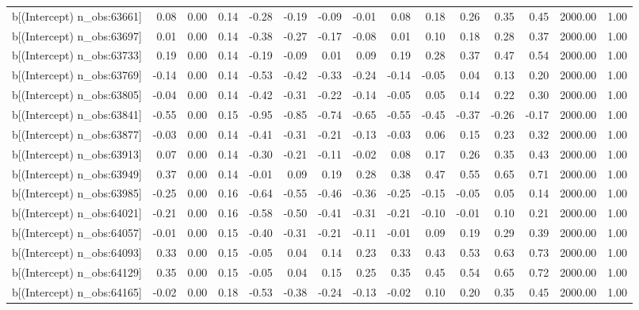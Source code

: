\begin{table}[ht]
\begin{tabular}{rrrrrrrrrrrrrrr}
  b[(Intercept) n\_obs:63661] & 0.08 & 0.00 & 0.14 & -0.28 & -0.19 & -0.09 & -0.01 & 0.08 & 0.18 & 0.26 & 0.35 & 0.45 & 2000.00 & 1.00 \\ 
  b[(Intercept) n\_obs:63697] & 0.01 & 0.00 & 0.14 & -0.38 & -0.27 & -0.17 & -0.08 & 0.01 & 0.10 & 0.18 & 0.28 & 0.37 & 2000.00 & 1.00 \\ 
  b[(Intercept) n\_obs:63733] & 0.19 & 0.00 & 0.14 & -0.19 & -0.09 & 0.01 & 0.09 & 0.19 & 0.28 & 0.37 & 0.47 & 0.54 & 2000.00 & 1.00 \\ 
  b[(Intercept) n\_obs:63769] & -0.14 & 0.00 & 0.14 & -0.53 & -0.42 & -0.33 & -0.24 & -0.14 & -0.05 & 0.04 & 0.13 & 0.20 & 2000.00 & 1.00 \\ 
  b[(Intercept) n\_obs:63805] & -0.04 & 0.00 & 0.14 & -0.42 & -0.31 & -0.22 & -0.14 & -0.05 & 0.05 & 0.14 & 0.22 & 0.30 & 2000.00 & 1.00 \\ 
  b[(Intercept) n\_obs:63841] & -0.55 & 0.00 & 0.15 & -0.95 & -0.85 & -0.74 & -0.65 & -0.55 & -0.45 & -0.37 & -0.26 & -0.17 & 2000.00 & 1.00 \\ 
  b[(Intercept) n\_obs:63877] & -0.03 & 0.00 & 0.14 & -0.41 & -0.31 & -0.21 & -0.13 & -0.03 & 0.06 & 0.15 & 0.23 & 0.32 & 2000.00 & 1.00 \\ 
  b[(Intercept) n\_obs:63913] & 0.07 & 0.00 & 0.14 & -0.30 & -0.21 & -0.11 & -0.02 & 0.08 & 0.17 & 0.26 & 0.35 & 0.43 & 2000.00 & 1.00 \\ 
  b[(Intercept) n\_obs:63949] & 0.37 & 0.00 & 0.14 & -0.01 & 0.09 & 0.19 & 0.28 & 0.38 & 0.47 & 0.55 & 0.65 & 0.71 & 2000.00 & 1.00 \\ 
  b[(Intercept) n\_obs:63985] & -0.25 & 0.00 & 0.16 & -0.64 & -0.55 & -0.46 & -0.36 & -0.25 & -0.15 & -0.05 & 0.05 & 0.14 & 2000.00 & 1.00 \\ 
  b[(Intercept) n\_obs:64021] & -0.21 & 0.00 & 0.16 & -0.58 & -0.50 & -0.41 & -0.31 & -0.21 & -0.10 & -0.01 & 0.10 & 0.21 & 2000.00 & 1.00 \\ 
  b[(Intercept) n\_obs:64057] & -0.01 & 0.00 & 0.15 & -0.40 & -0.31 & -0.21 & -0.11 & -0.01 & 0.09 & 0.19 & 0.29 & 0.39 & 2000.00 & 1.00 \\ 
  b[(Intercept) n\_obs:64093] & 0.33 & 0.00 & 0.15 & -0.05 & 0.04 & 0.14 & 0.23 & 0.33 & 0.43 & 0.53 & 0.63 & 0.73 & 2000.00 & 1.00 \\ 
  b[(Intercept) n\_obs:64129] & 0.35 & 0.00 & 0.15 & -0.05 & 0.04 & 0.15 & 0.25 & 0.35 & 0.45 & 0.54 & 0.65 & 0.72 & 2000.00 & 1.00 \\ 
  b[(Intercept) n\_obs:64165] & -0.02 & 0.00 & 0.18 & -0.53 & -0.38 & -0.24 & -0.13 & -0.02 & 0.10 & 0.20 & 0.35 & 0.45 & 2000.00 & 1.00 \\ 

\end{tabular}
\end{table}

